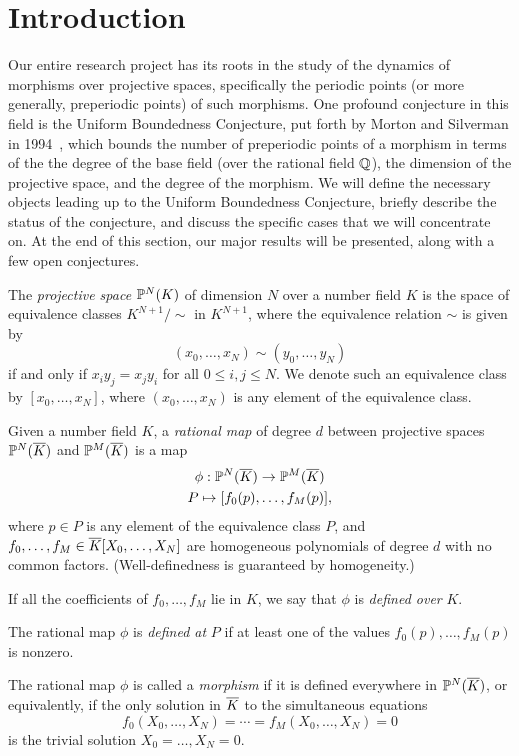 \section{Introduction}
\label{sec:bg}

Our entire research project has its roots in the study of the dynamics
of morphisms over projective spaces, specifically the periodic points
(or more generally, preperiodic points) of such morphisms. One
profound conjecture in this field is the Uniform Boundedness
Conjecture, put forth by Morton and Silverman in
1994~\cite{MR1264933}, which bounds the number of preperiodic points
of a morphism in terms of the the degree of the base field (over the
rational field $\Q$), the dimension of the projective space, and the
degree of the morphism. We will define the necessary objects leading
up to the Uniform Boundedness Conjecture, briefly describe the status
of the conjecture, and discuss the specific cases that we will
concentrate on. At the end of this section, our major results will be
presented, along with a few open conjectures.

\begin{definition}
  The \emph{projective space} $\P^N(K)$ of dimension $N$ over a number
  field $K$ is the space of equivalence classes $K^{N+1}/\sim$ in
  $K^{N+1}$, where the equivalence relation $\sim$ is given by
  \[
  (x_0, \dots, x_N) \sim (y_0, \dots, y_N)
  \]
  if and only if $x_i y_j = x_j y_i$ for all $0 \le i, j \le N$. We
  denote such an equivalence class by $[x_0, \dots, x_N]$, where
  $(x_0, \dots, x_N)$ is any element of the equivalence class.
\end{definition}

\begin{definition}
  Given a number field $K$, a \emph{rational map} of degree $d$
  between projective spaces $\P^N(\ol{K})$ and $\P^M(\ol{K})$ is a
  map
  \[
  \begin{gathered}
    \phi: \P^N(\ol{K}) \to \P^M(\ol{K})\\
    P \mapsto [f_0(p), \dots, f_M(p)],
  \end{gathered}
  \]
  where $p \in P$ is any element of the equivalence class $P$, and
  $f_0, \dots, f_M \in \ol{K}[X_0, \dots, X_N]$ are homogeneous
  polynomials of degree $d$ with no common factors. (Well-definedness
  is guaranteed by homogeneity.)

  If all the coefficients of $f_0, \dots, f_M$ lie in $K$, we say that $\phi$ is \emph{defined over} $K$.

  The rational map $\phi$ is \emph{defined at} $P$ if at least one of
  the values $f_0(p), \dots, f_M(p)$ is nonzero.

  The rational map $\phi$ is called a \emph{morphism} if it is defined
  everywhere in $\P^N(\ol{K})$, or equivalently, if the only solution
  in $\ol{K}$ to the simultaneous equations
  \[
  f_0(X_0, \dots, X_N) = \cdots = f_M(X_0, \dots, X_N) = 0
  \]
  is the trivial solution $X_0 = \dots, X_N = 0$.
\end{definition}

